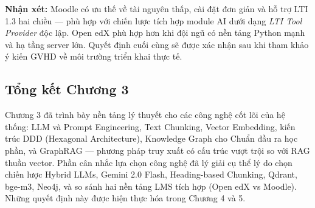 \noindent\textbf{Nhận xét:} Moodle có ưu thế về tài nguyên thấp, cài đặt đơn
giản và hỗ trợ LTI 1.3 hai chiều --- phù hợp với chiến lược tích hợp module
AI dưới dạng \textit{LTI Tool Provider} độc lập. Open edX phù hợp hơn khi đội
ngũ có nền tảng Python mạnh và hạ tầng server lớn. Quyết định cuối cùng sẽ
được xác nhận sau khi tham khảo ý kiến GVHD về môi trường triển khai thực tế.

\subsection{Tổng kết Chương 3}

Chương 3 đã trình bày nền tảng lý thuyết cho các công nghệ cốt lõi của hệ
thống: LLM và Prompt Engineering, Text Chunking, Vector Embedding, kiến trúc
DDD (Hexagonal Architecture), Knowledge Graph cho Chuẩn đầu ra học phần, và
GraphRAG --- phương pháp truy xuất có cấu trúc vượt trội so với RAG thuần
vector. Phần cân nhắc lựa chọn công nghệ đã lý giải cụ thể lý do chọn chiến
lược Hybrid LLMs, Gemini 2.0 Flash, Heading-based Chunking, Qdrant, bge-m3,
Neo4j, và so sánh hai nền tảng LMS tích hợp (Open edX vs Moodle).
Những quyết định này được hiện thực hóa trong Chương 4 và 5.
